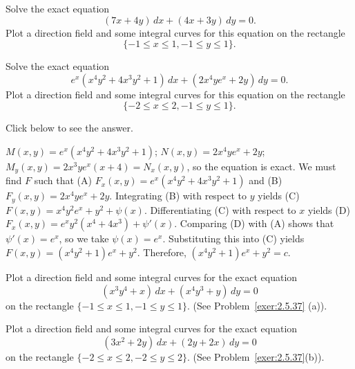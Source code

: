 \documentclass{ximera}
\begin{document}
\begin{problem}\label{exer:2.5.23}
Solve the exact equation
$$
(7x+4y)\,dx+(4x+3y)\,dy=0.
$$
Plot a direction field and some integral curves for this equation on
the rectangle
$$
\{-1\leq x\leq 1,-1\leq y\leq 1\}.
$$
\end{problem}

\begin{problem}\label{exer:2.5.24}
Solve the exact equation
$$
e^x(x^4y^2+4x^3y^2+1)\,dx+(2x^4ye^x+2y)\,dy=0.
$$
Plot a direction field and some integral curves for this equation on
the rectangle
$$
\{-2\leq x\leq 2,-1\leq y\leq 1\}.
$$

Click below to see the answer.

\begin{expandable}
    $M(x,y)=e^x(x^4y^2+4x^3y^2+1)$;\;
$N(x,y)=2x^4ye^x+2y$;\;
$M_y(x,y)=2x^3ye^x(x+4)=N_x(x,y)$,
so the  equation is  exact.
We must find $F$ such that
(A) $F_x(x,y)=e^x(x^4y^2+4x^3y^2+1)$ and
(B) $F_y(x,y)=2x^4ye^x+2y$.
Integrating (B) with respect to $y$ yields
(C) $F(x,y)=x^4y^2e^x+y^2+\psi(x)$.
Differentiating (C) with respect to $x$  yields
(D) $F_x(x,y)=e^xy^2(x^4+4x^3)+\psi'(x)$.
Comparing (D) with (A)  shows that
$\psi'(x)=e^x$, so we take
$\psi(x)=e^x$.
Substituting this into (C) yields
$F(x,y)=(x^4y^2+1)e^x+y^2$.
Therefore, $(x^4y^2+1)e^x+y^2=c$.
\end{expandable}
\end{problem}

\begin{problem}\label{exer:2.5.25}
Plot a direction field and some integral curves for the exact equation
$$
(x^3y^4+x)\,dx+(x^4y^3+y)\,dy=0
$$
on the rectangle $\{-1\leq x\leq 1,-1\leq y\leq 1\}$. (See
Problem~\ref{exer:2.5.37} (a)).
\end{problem}

\begin{problem}\label{exer:2.5.26}
Plot a direction field and some integral curves for the exact equation
$$
(3x^2+2y)\,dx+(2y+2x)\,dy=0
$$
on the rectangle $\{-2\leq x\leq 2,-2\leq y\leq 2\}$. (See
Problem~\ref{exer:2.5.37}(b)).
\end{problem}
\end{document}
